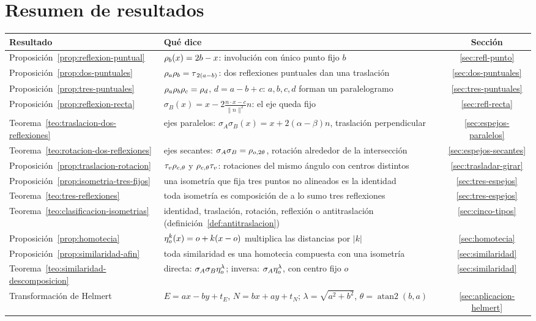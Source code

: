 \section{Resumen de resultados}

\begin{center}
\small
\begin{tabularx}{\textwidth}{@{}>{\raggedright\arraybackslash}p{40mm} Y c@{}}
\toprule
Resultado & Qué dice & Sección\\
\midrule
Proposición~\ref{prop:reflexion-puntual} &
\(\rho_{b}(x)=2b-x\): involución con único punto fijo \(b\) & \ref{sec:refl-punto}\\
Proposición~\ref{prop:dos-puntuales} &
\(\rho_{a}\rho_{b}=\tau_{\,2(a-b)}\): dos reflexiones puntuales dan una traslación & \ref{sec:dos-puntuales}\\
Proposición~\ref{prop:tres-puntuales} &
\(\rho_{a}\rho_{b}\rho_{c}=\rho_{d}\), \(d=a-b+c\): \(a,b,c,d\) forman un paralelogramo & \ref{sec:tres-puntuales}\\
Proposición~\ref{prop:reflexion-recta} &
\(\sigma_{B}(x)=x-2\frac{n\cdot x-c}{\lVert n\rVert^2}n\): el eje queda fijo & \ref{sec:refl-recta}\\
Teorema~\ref{teo:traslacion-dos-reflexiones} &
ejes paralelos: \(\sigma_{A}\sigma_{B}(x)=x+2(\alpha-\beta)n\), traslación perpendicular & \ref{sec:espejos-paralelos}\\
Teorema~\ref{teo:rotacion-dos-reflexiones} &
ejes secantes: \(\sigma_{A}\sigma_{B}=\rho_{o,2\theta}\), rotación alrededor de la intersección & \ref{sec:espejos-secantes}\\
Proposición~\ref{prop:traslacion-rotacion} &
\(\tau_v\rho_{c,\theta}\) y \(\rho_{c,\theta}\tau_v\): rotaciones del mismo ángulo con centros distintos & \ref{sec:trasladar-girar}\\
Proposición~\ref{prop:isometria-tres-fijos} &
una isometría que fija tres puntos no alineados es la identidad & \ref{sec:tres-espejos}\\
Teorema~\ref{teo:tres-reflexiones} &
toda isometría es composición de a lo sumo tres reflexiones & \ref{sec:tres-espejos}\\
Teorema~\ref{teo:clasificacion-isometrias} &
identidad, traslación, rotación, reflexión o antitraslación (definición~\ref{def:antitraslacion}) & \ref{sec:cinco-tipos}\\
Proposición~\ref{prop:homotecia} &
\(\eta_{o}^{k}(x)=o+k(x-o)\) multiplica las distancias por \(|k|\) & \ref{sec:homotecia}\\
Proposición~\ref{prop:similaridad-afin} &
toda similaridad es una homotecia compuesta con una isometría & \ref{sec:similaridad}\\
Teorema~\ref{teo:similaridad-descomposicion} &
directa: \(\sigma_{A}\sigma_{B}\eta_{o}^{\lambda}\); inversa: \(\sigma_{A}\eta_{o}^{\lambda}\), con centro fijo \(o\) & \ref{sec:similaridad}\\
Transformación de Helmert &
\(E=ax-by+t_E\), \(N=bx+ay+t_N\); \(\lambda=\sqrt{a^2+b^2}\), \(\theta=\operatorname{atan2}(b,a)\) & \ref{sec:aplicacion-helmert}\\
\bottomrule
\end{tabularx}
\end{center}


